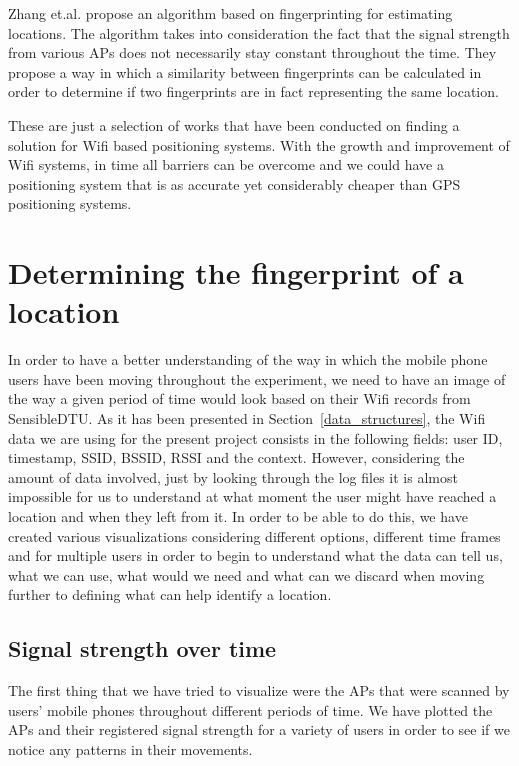 Zhang et.al. \cite{zhang2012polaris} propose an algorithm based on
fingerprinting for estimating locations. The algorithm takes into consideration
the fact that the signal strength from various APs does not necessarily stay
constant throughout the time. They propose a way in which a similarity between
fingerprints can be calculated in order to determine if two fingerprints are in
fact representing the same location.

These are just a selection of works that have been conducted on finding a
solution for Wifi based positioning systems. With the growth and improvement of
Wifi systems, in time all barriers can be overcome and we could have a
positioning system that is as accurate yet considerably cheaper than GPS
positioning systems.

\section{Determining the fingerprint of a location}
In order to have a better understanding of the way in which the mobile phone
users have been moving throughout the experiment, we need to have an image of
the way a given period of time would look based on their Wifi records from
SensibleDTU. As it has been presented in Section~\ref{data_structures}, the Wifi
data we are using for the present project consists in the following fields:
user ID, timestamp, SSID, BSSID, RSSI and the context. However, considering the
amount of data involved, just by looking through the log files it is almost
impossible for us to understand at what moment the user might have reached a
location and when they left from it. In order to be able to do this, we have
created various visualizations considering different options, different time
frames and for multiple users in order to begin to understand what the data can
tell us, what we can use, what would we need and what can we discard when moving
further to defining what can help identify a location.

\subsection{Signal strength over time}

The first thing that we have tried to visualize were the APs that were scanned
by users' mobile phones throughout different periods of time. We have plotted the
APs and their registered signal strength for a variety of users in order to see
if we notice any patterns in their movements.

